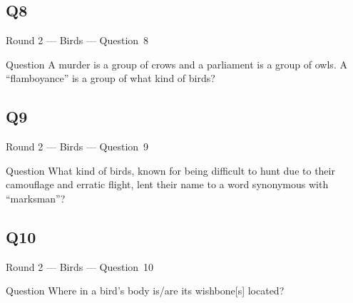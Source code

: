 \documentclass[11pt]{beamer}
\begin{document}
\subsection*{Q8}
\begin{frame}[t]{Round 2 --- Birds --- \mbox{Question 8}}
\vspace{-0.5em}
\begin{block}{Question}
A murder is a group of crows and a parliament is a group of owls. A ``flamboyance'' is a group of what kind of birds?
\end{block}
\end{frame}
\subsection*{Q9}
\begin{frame}[t]{Round 2 --- Birds --- \mbox{Question 9}}
\vspace{-0.5em}
\begin{block}{Question}
What kind of birds, known for being difficult to hunt due to their camouflage and erratic flight, lent their name to a word synonymous with ``marksman''?
\end{block}
\end{frame}
\subsection*{Q10}
\begin{frame}[t]{Round 2 --- Birds --- \mbox{Question 10}}
\vspace{-0.5em}
\begin{block}{Question}
Where in a bird's body is/are its wishbone[s] located?
\end{block}
\end{frame}
\end{document}
